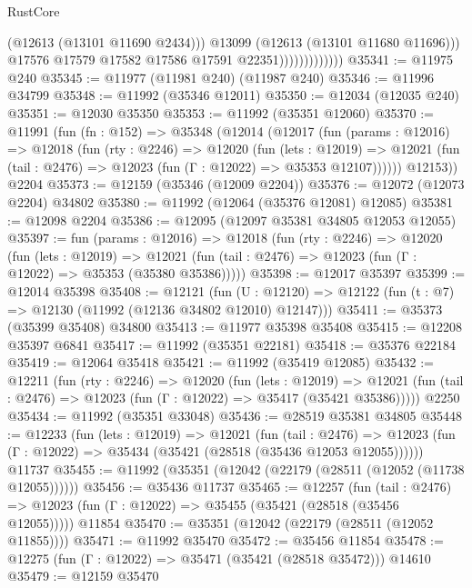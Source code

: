 \begin{lexlean}{RustCore}
\begin{coremodule}
                                  (@12613 (@13101 @11690 @2434)))
                                @13099
                                (@12613 (@13101 @11680 @11696)))
                              @17576
                              @17579
                              @17582
                              @17586
                              @17591
                              @22351)))))))))))))
@35341 := @11975 @240
@35345 := @11977 (@11981 @240) (@11987 @240)
@35346 := @11996 @34799
@35348 := @11992 (@35346 @12011)
@35350 := @12034 (@12035 @240)
@35351 := @12030 @35350
@35353 := @11992 (@35351 @12060)
@35370 := @11991
    (fun (fn : @152) =>
    @35348
      (@12014
        (@12017
          (fun (params : @12016) =>
          @12018
            (fun (rty : @2246) =>
            @12020
              (fun (lets : @12019) =>
              @12021 (fun (tail : @2476) => @12023 (fun (Γ : @12022) => @35353 @12107))))))
        @12153))
    @2204
@35373 := @12159 (@35346 (@12009 @2204))
@35376 := @12072 (@12073 @2204) @34802
@35380 := @11992 (@12064 (@35376 @12081) @12085)
@35381 := @12098 @2204
@35386 := @12095 (@12097 @35381 @34805 @12053 @12055)
@35397 := fun (params : @12016) =>
  @12018
    (fun (rty : @2246) =>
    @12020
      (fun (lets : @12019) =>
      @12021 (fun (tail : @2476) => @12023 (fun (Γ : @12022) => @35353 (@35380 @35386)))))
@35398 := @12017 @35397
@35399 := @12014 @35398
@35408 := @12121
    (fun (U : @12120) => @12122 (fun (t : @7) => @12130 (@11992 (@12136 @34802 @12010) @12147)))
@35411 := @35373 (@35399 @35408) @34800
@35413 := @11977 @35398 @35408
@35415 := @12208 @35397 @6841
@35417 := @11992 (@35351 @22181)
@35418 := @35376 @22184
@35419 := @12064 @35418
@35421 := @11992 (@35419 @12085)
@35432 := @12211
    (fun (rty : @2246) =>
    @12020
      (fun (lets : @12019) =>
      @12021 (fun (tail : @2476) => @12023 (fun (Γ : @12022) => @35417 (@35421 @35386)))))
    @2250
@35434 := @11992 (@35351 @33048)
@35436 := @28519 @35381 @34805
@35448 := @12233
    (fun (lets : @12019) =>
    @12021
      (fun (tail : @2476) =>
      @12023 (fun (Γ : @12022) => @35434 (@35421 (@28518 (@35436 @12053 @12055))))))
    @11737
@35455 := @11992 (@35351 (@12042 (@22179 (@28511 (@12052 (@11738 @12055))))))
@35456 := @35436 @11737
@35465 := @12257
    (fun (tail : @2476) => @12023 (fun (Γ : @12022) => @35455 (@35421 (@28518 (@35456 @12055)))))
    @11854
@35470 := @35351 (@12042 (@22179 (@28511 (@12052 @11855))))
@35471 := @11992 @35470
@35472 := @35456 @11854
@35478 := @12275 (fun (Γ : @12022) => @35471 (@35421 (@28518 @35472))) @14610
@35479 := @12159 @35470

\end{coremodule}
\end{lexlean}
